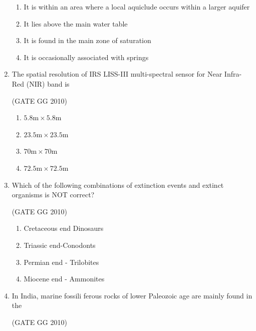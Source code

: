 \documentclass[journal]{IEEEtran}
\begin{document}
\begin{enumerate}[start=1]
\begin{enumerate}

    \item It is within an area where a local aquiclude occurs within a larger aquifer
    \item It lies above the main water table
    \item It is found in the main zone of saturation
    \item It is occasionally associated with springs

\end{enumerate}
\item The spatial resolution of IRS LISS-III multi-spectral sensor for Near Infra-Red (NIR) band is

\hfill{(GATE GG 2010)}\\

\begin{enumerate}
    \item $5.8\text{m}\times 5.8\text{m}$ 
    \item $23.5\text{m}\times 23.5\text{m}$
    \item $70\text{m}\times 70\text{m}$
    \item $72.5\text{m}\times 72.5\text{m}$ 
\end{enumerate}

\item Which of the following combinations of extinction events and extinct organisms is NOT correct?

\hfill{(GATE GG 2010)}\\

\begin{enumerate}
    \item Cretaceous end Dinosaurs
    \item Triassic end-Conodonts
    \item Permian end - Trilobites
    \item Miocene end - Ammonites
\end{enumerate}
\item In India, marine fossili ferous rocks of lower Paleozoic age are mainly found in the

\hfill{(GATE GG 2010)}\\

\begin{enumerate}
\end{enumerate}


\end{enumerate}
\end{document}
